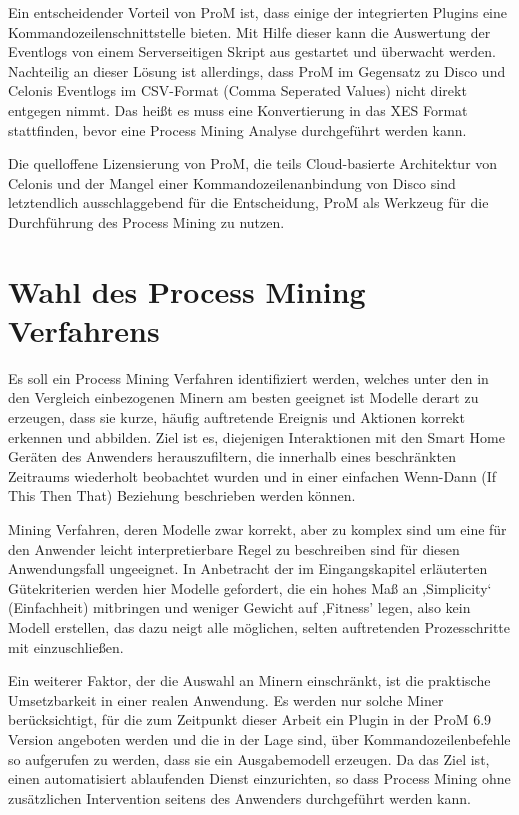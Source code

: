 Ein entscheidender Vorteil von ProM ist, dass einige der integrierten Plugins eine Kommandozeilenschnittstelle bieten. Mit Hilfe dieser kann die Auswertung der Eventlogs von einem Serverseitigen Skript aus gestartet und überwacht werden. Nachteilig an dieser Lösung ist allerdings, dass ProM im Gegensatz zu Disco und Celonis Eventlogs im CSV-Format (Comma Seperated Values) nicht direkt entgegen nimmt. Das heißt es muss eine Konvertierung in das XES Format stattfinden, bevor eine Process Mining Analyse durchgeführt werden kann.

Die quelloffene Lizensierung von ProM, die teils Cloud-basierte Architektur von Celonis und der Mangel einer Kommandozeilenanbindung von Disco sind letztendlich ausschlaggebend für die Entscheidung, ProM als Werkzeug für die Durchführung des Process Mining zu nutzen. 

\section{Wahl des Process Mining Verfahrens}

Es soll ein Process Mining Verfahren identifiziert werden, welches unter den in den Vergleich einbezogenen Minern am besten geeignet ist Modelle derart zu erzeugen, dass sie kurze, häufig auftretende Ereignis und Aktionen korrekt erkennen und abbilden. Ziel ist es, diejenigen Interaktionen mit den Smart Home Geräten des Anwenders herauszufiltern, die innerhalb eines beschränkten Zeitraums wiederholt beobachtet wurden und in einer einfachen Wenn-Dann (If This Then That) Beziehung beschrieben werden können. 

Mining Verfahren, deren Modelle zwar korrekt, aber zu komplex sind um eine für den Anwender leicht interpretierbare Regel zu beschreiben sind für diesen Anwendungsfall ungeeignet. In Anbetracht der im Eingangskapitel erläuterten Gütekriterien werden hier Modelle gefordert, die ein hohes Maß an ‚Simplicity‘ (Einfachheit) mitbringen und weniger Gewicht auf ,Fitness' legen, also kein Modell erstellen, das dazu neigt alle möglichen, selten auftretenden Prozesschritte mit einzuschließen. 

Ein weiterer Faktor, der die Auswahl an Minern einschränkt, ist die praktische Umsetzbarkeit in einer realen Anwendung. Es werden nur solche Miner berücksichtigt, für die zum Zeitpunkt dieser Arbeit ein Plugin in der ProM 6.9 Version angeboten werden und die in der Lage sind, über Kommandozeilenbefehle so aufgerufen zu werden, dass sie ein Ausgabemodell erzeugen. Da das Ziel ist, einen automatisiert ablaufenden Dienst einzurichten, so dass Process Mining ohne zusätzlichen Intervention seitens des Anwenders durchgeführt werden kann.



